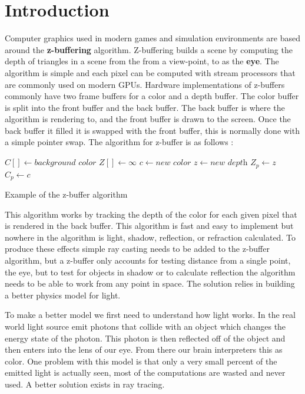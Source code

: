 \documentclass[12pt,a4paper,oneside]{article}
\begin{document}
\section{ Introduction }

Computer graphics used in modern games and simulation environments are based around the \textbf{z-buffering} algorithm.  Z-buffering builds a scene by computing the depth of triangles in a scene from the from a view-point,  to as the \textbf{eye}.  The algorithm is simple and each pixel can be computed with stream processors that are commonly  used on modern GPUs.  Hardware implementations of z-buffers commonly have two frame buffers for a color and a depth buffer.    The color buffer is split into the front buffer and the back buffer.  The back buffer is where the algorithm is rendering to, and the front buffer is drawn to the screen.  Once the back buffer it filled it is swapped with the front buffer, this is normally done with a simple pointer swap.  The algorithm for z-buffer is as follows \cite{fast:2008}:

\begin{algorithm}
\begin{algorithmic}[1]
\STATE $C[ ] \gets \textit{background color}$ 
\STATE $Z[ ] \gets \infty$
		\STATE $c \gets \textit{new color}$
		\STATE $z \gets \textit{new depth}$
			\STATE $Z_{p} \gets z$
			\STATE $C_{p} \gets c$
		\ENDIF
	\ENDFOR
\ENDFOR
\end{algorithmic}
\caption{Example of the z-buffer algorithm}
\label{z-buffer}
\end{algorithm}

This algorithm works by tracking the depth of the color for each given pixel that is rendered in the back buffer.  This algorithm is fast and easy to implement but nowhere in the algorithm is light, shadow, reflection, or refraction calculated.  To produce these effects simple ray casting needs to be added to the z-buffer algorithm, but a z-buffer only accounts for testing distance from a single point, the eye, but to test for objects in shadow or to calculate reflection the algorithm needs to be able to work from any point in space.  The solution relies in building a better physics model for light.

To make a better model we first need to understand how light works.  In the real world light source emit photons that collide with an object which changes the energy state of the photon.  This photon is then reflected off of the object and then enters into the lens of our eye.  From there our brain interpreters this as color.  One problem with this model is that only a very small percent of the emitted light is actually seen, most of the computations are wasted and never used.  A better solution exists in ray tracing.  
\end{document}
